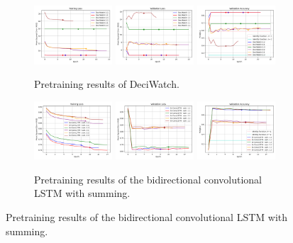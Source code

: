 \documentclass[./main.tex]{subfiles}
\begin{document}
\begin{figure}[htbp]
    \begin{subfigure}[b]{\textwidth}
        \centering
        \includegraphics[width=0.32\textwidth]{./entities/pretrain_res/deciwatch/train_losses.png}
        \includegraphics[width=0.32\textwidth]{./entities/pretrain_res/deciwatch/val_losses.png}
        \includegraphics[width=0.32\textwidth]{./entities/pretrain_res/deciwatch/val_accs.png}
        \caption{Pretraining results of DeciWatch.}
    \end{subfigure}
   \hfill

   \begin{subfigure}[b]{\textwidth}
    \centering
    \includegraphics[width=0.32\textwidth]{./entities/pretrain_res/unipose/train_losses.png}
    \includegraphics[width=0.32\textwidth]{./entities/pretrain_res/unipose/val_losses.png}
    \includegraphics[width=0.32\textwidth]{./entities/pretrain_res/unipose/val_accs.png}
    \caption{Pretraining results of the bidirectional convolutional LSTM with summing.}
    \end{subfigure}
    \hfill


\end{figure}
\end{document}
